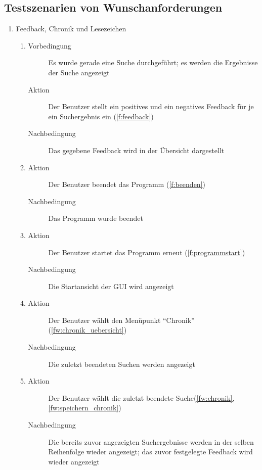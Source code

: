 \subsection{Testszenarien von Wunschanforderungen}
\begin{enumerate} [label=\bfseries /TSW \arabic*0/, leftmargin=*]
	\item Feedback, Chronik und Lesezeichen
	\begin{enumerate}
		\item
		\begin{description}
			\item[Vorbedingung] Es wurde gerade eine Suche durchgeführt; es werden die Ergebnisse der Suche angezeigt
			\item[Aktion] Der Benutzer stellt ein positives und ein negatives Feedback für je ein Suchergebnis ein (\ref{f:feedback})
			\item[Nachbedingung] Das gegebene Feedback wird in der Übersicht dargestellt
		\end{description}
		\item
		\begin{description}
			\item[Aktion] Der Benutzer beendet das Programm (\ref{f:beenden})
			\item[Nachbedingung] Das Programm wurde beendet
		\end{description}
		\item
		\begin{description}
			\item[Aktion] Der Benutzer startet das Programm erneut (\ref{f:programmstart})
			\item[Nachbedingung] Die Startansicht der GUI wird angezeigt
		\end{description}
		\item
		\begin{description}
			\item[Aktion] Der Benutzer wählt den Menüpunkt \enquote{Chronik} (\ref{fw:chronik_uebersicht})
			\item[Nachbedingung] Die zuletzt beendeten Suchen werden angezeigt
		\end{description}
		\item
		\begin{description}
			\item[Aktion] Der Benutzer wählt die zuletzt beendete Suche(\ref{fw:chronik}, \ref{fw:speichern_chronik})
			\item[Nachbedingung] Die bereits zuvor angezeigten Suchergebnisse werden in der selben Reihenfolge wieder angezeigt; das zuvor festgelegte Feedback wird wieder angezeigt

\end{description}
\end{enumerate}
\end{enumerate}

